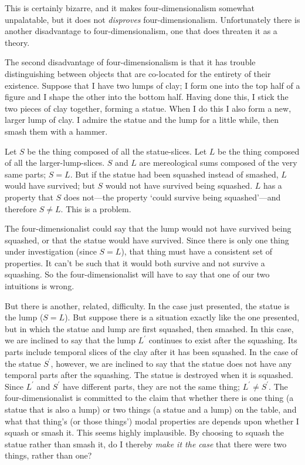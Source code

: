 \documentclass[11pt]{article}
\begin{document}
\begin{spacing}{1.5}
This is certainly bizarre, and it makes four-dimensionalism somewhat
unpalatable, but it does not {\em disproves} four-dimensionalism.
Unfortunately there is another disadvantage to four-dimensionalism,
one that does threaten it as a theory.

The second disadvantage of four-dimensionalism is that it has trouble
distinguishing between objects that are co-located for the entirety of
their existence.  Suppose that I have two lumps of clay; I form one
into the top half of a figure and I shape the other into the bottom
half.  Having done this, I stick the two pieces of clay together,
forming a statue.  When I do this I also form a new, larger lump of
clay.  I admire the statue and the lump for a little while, then smash
them with a hammer.

Let $S$ be the thing composed of all the statue-slices.  Let $L$ be
the thing composed of all the larger-lump-slices.  $S$ and $L$ are
mereological sums composed of the very same parts; $S = L$.  But if
the statue had been squashed instead of smashed, $L$ would have
survived; but $S$ would not have survived being squashed.  $L$ has a
property that $S$ does not---the property `could survive being
squashed'---and therefore $S \neq L$.  This is a problem.

The four-dimensionalist could say that the lump would not have
survived being squashed, or that the statue would have survived.
Since there is only one thing under investigation (since $S = L$),
that thing must have a consistent set of properties.  It can't be such
that it would both survive and not survive a squashing.  So the
four-dimensionalist will have to say that one of our two intuitions is
wrong.

But there is another, related, difficulty.  In the case just
presented, the statue is the lump ($S = L$).  But suppose there is a
situation exactly like the one presented, but in which the statue and
lump are first squashed, then smashed.  In this case, we are inclined
to say that the lump $L^{\prime}$ continues to exist after the
squashing.  Its parts include temporal slices of the clay after it has
been squashed.  In the case of the statue $S^{\prime}$, however, we
are inclined to say that the statue does not have any temporal parts
after the squashing.  The statue is destroyed when it is squashed.
Since $L^{\prime}$ and $S^{\prime}$ have different parts, they are not
the same thing; $L^{\prime} \neq S^{\prime}$.  The four-dimensionalist
is committed to the claim that whether there is one thing (a statue
that is also a lump) or two things (a statue and a lump) on the table,
and what that thing's (or those things') modal properties are depends
upon whether I squash or smash it.  This seems highly implausible.  By
choosing to squash the statue rather than smash it, do I thereby {\em
  make it the case} that there were two things, rather than one?


\end{spacing}
\end{document}
